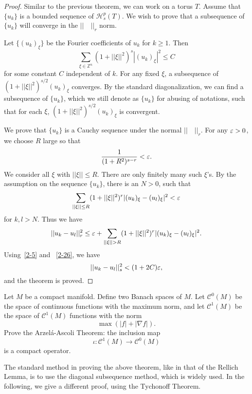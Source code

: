 \begin{proof} Similar to the previous theorem, we can
work on a torus $T$. Assume
that $\{ u_k\}$ is a bounded sequence of $\mathcal
H^{p}_s(T)$. We wish to prove that a subsequence
of $\{u_k\}$ will converge in the $||\quad ||_r$ norm.

Let $\{(u_k)_\xi\}$ be the Fourier coefficients of $u_k$ for
$k\geq 1$. Then
\begin{equation}\label{2-5}
\sum_{\xi\in \mathbb Z^{n}} (1+||\xi||^2)^s |(u_k)_\xi|^2\leq C
\end{equation}
for some constant $C$ independent of $k$.
For any fixed $\xi$, a subsequence of
$(1+||\xi||^2)^{s/2} (u_k)_\xi$ converges. By the standard
diagonalization, we can find a subsequence of $\{u_k\}$,
which we still denote as $\{u_k\}$ for abusing of notations,
such that for each
$\xi$,
$(1+||
\xi||^2)^{s/2} (u_k)_\xi$ is convergent.

We prove that $\{u_k\}$ is a Cauchy sequence under the normal
$||\quad||_r$. For any $\varepsilon>0$, we choose $R$ large
so that
\begin{equation}\label{2-26}
\frac{1}{(1+R^2)^{s-r}}<\varepsilon.
\end{equation}
We consider all $\xi$ with $||\xi||\leq R$.
There are only finitely many such $\xi$'s.
By the
assumption on the sequence $\{u_k\}$, there is an $N>0$,
such that
\[
\sum_{||\xi||\leq R} (1+||\xi||^2)^r
|(u_k)_\xi-(u_l)_\xi|^2<\varepsilon
\]
for $k,l>N$. Thus we have
\[
||u_k-u_l||_r^2\leq\eps+\sum_{||\xi||>R}
(1+||\xi||^2)^r |(u_k)_\xi-(u_l)_\xi|^2.
\]
Using~\eqref{2-5} and ~\eqref{2-26}, we have
\[
||u_k-u_l||^2_s<(1+2C)\varepsilon,
\]
and the theorem is proved.

\end{proof}


\begin{ex} Let $M$ be a compact manifold. Define two Banach spaces of $M$. Let $\mathcal C^0(M)$ be the space of continuous functions with the maximum norm, and let $\mathcal C^1(M)$ be the space of $\mathcal C^1(M)$ functions with the norm
\[
\max(|f|+|\nabla f|).
\]
Prove the Arzel\'a-Ascoli Theorem: the inclusion map
\[
\iota: \mathcal C^1(M)\to \mathcal C^0(M)
\]
is a compact operator.
\end{ex}



The standard method in proving the above theorem, like in that of the Rellich Lemma, is to use the diagonal subsequence method, which is widely used. In the following, we give a different proof, using the Tychonoff Theorem.

